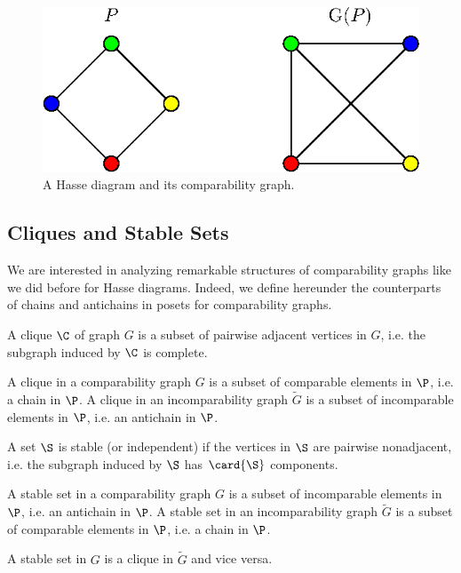 \begin{figure}
\centering
\includegraphics[height=0.2\textheight]{fig/comp-graph}
\caption{\label{fig:comp-graph} A Hasse diagram and its comparability graph.}
\end{figure}




\subsection{Cliques and Stable Sets}

We are interested in analyzing remarkable structures of comparability graphs
like we did before for Hasse diagrams. Indeed, we define hereunder the
counterparts of chains and antichains in posets for comparability graphs.

\begin{definition}[Clique]
A clique $\C$ of graph $G$ is a subset of pairwise adjacent vertices in $G$,
i.e. the subgraph induced by $\C$ is complete.
\end{definition}
A clique in a comparability graph ${G}$ is a subset of comparable elements in
$\P$, i.e. a chain in $\P$.
A clique in an incomparability graph $\widetilde{G}$ is a subset of
incomparable  elements in $\P$, i.e. an antichain in $\P$.

\begin{definition}
A set $\S$ is stable (or independent) if the vertices in $\S$ are pairwise
nonadjacent, i.e. the subgraph induced by $\S$ has $\card{\S}$ components.
\end{definition}
A stable set in a comparability graph ${G}$ is a subset of incomparable
elements in $\P$, i.e. an antichain in $\P$.
A stable set in an incomparability graph $\widetilde{G}$ is a subset of
comparable elements in $\P$, i.e. a chain in $\P$.


A stable set in ${G}$ is a clique in $\widetilde{G}$ and vice versa.



